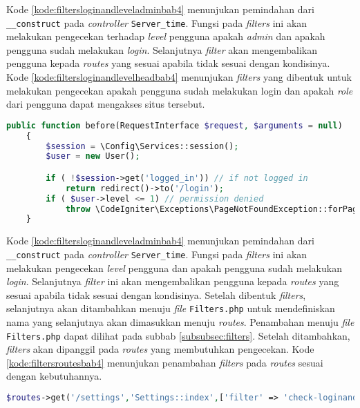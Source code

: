 Kode \ref{kode:filtersloginandleveladminbab4} menunjukan pemindahan dari \texttt{\_\_construct} pada \textit{controller}  \texttt{Server\_time}. Fungsi pada \textit{filters} ini akan melakukan pengecekan terhadap \textit{level} pengguna apakah \textit{admin} dan apakah pengguna sudah melakukan \textit{login}. Selanjutnya \textit{filter} akan mengembalikan pengguna kepada \textit{routes} yang sesuai apabila tidak sesuai dengan kondisinya. Kode \ref{kode:filtersloginandlevelheadbab4} menunjukan \textit{filters} yang dibentuk untuk melakukan pengecekan apakah pengguna sudah melakukan login dan apakah \textit{role} dari pengguna dapat mengakses situs tersebut.

\begin{lstlisting}[language=PHP, caption=Pemindahan kode pada \textit{Filters} \texttt{CheckLoginandLevelHead.php}, label=kode:filtersloginandlevelheadbab4]
	public function before(RequestInterface $request, $arguments = null)
    {   
        $session = \Config\Services::session();
        $user = new User();

		if ( !$session->get('logged_in')) // if not logged in
			return redirect()->to('/login');
        if ( $user->level <= 1) // permission denied
			throw \CodeIgniter\Exceptions\PageNotFoundException::forPageNotFound();	
    }
\end{lstlisting}

Kode \ref{kode:filtersloginandleveladminbab4} menunjukan pemindahan dari \texttt{\_\_construct} pada \textit{controller} \texttt{Server\_time}. Fungsi pada \textit{filters} ini akan melakukan pengecekan \textit{level} pengguna dan apakah pengguna sudah melakukan \textit{login}. Selanjutnya \textit{filter} ini akan mengembalikan pengguna kepada \textit{routes} yang sesuai apabila tidak sesuai dengan kondisinya. Setelah dibentuk \textit{filters}, selanjutnya akan ditambahkan menuju \textit{file} \texttt{Filters.php} untuk mendefiniskan nama yang selanjutnya akan dimasukkan menuju \textit{routes}. Penambahan menuju \textit{file} \texttt{Filters.php} dapat dilihat pada subbab \ref{subsubsec:filters}. Setelah ditambahkan, \textit{filters} akan dipanggil pada \textit{routes} yang membutuhkan pengecekan. Kode \ref{kode:filtersroutesbab4} menunjukan penambahan \textit{filters} pada \textit{routes} sesuai dengan kebutuhannya.

\begin{lstlisting}[language=PHP, caption=Penambahan \textit{filter} pada \textit{routes}, label=kode:filtersroutesbab4]
	$routes->get('/settings','Settings::index',['filter' => 'check-loginandlevelAdmin:dual,noreturn']);
\end{lstlisting}

